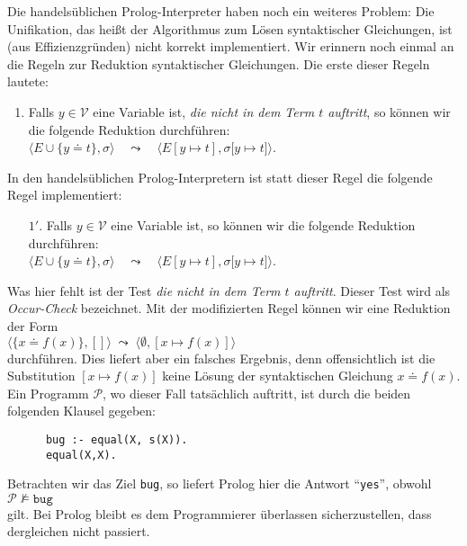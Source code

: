 Die handelsüblichen Prolog-Interpreter haben noch ein weiteres Problem: Die Unifikation,
das heißt der Algorithmus zum Lösen syntaktischer Gleichungen, ist (aus Effizienzgründen)
nicht korrekt implementiert.  Wir erinnern noch einmal an die Regeln zur Reduktion
syntaktischer Gleichungen.  Die erste dieser Regeln lautete:
\begin{enumerate}
\item Falls $y\in\mathcal{V}$ eine Variable ist, {\em die nicht in dem Term $t$ auftritt}, so
      können wir die folgende Reduktion durchführen: \\[0.1cm]
      \hspace*{2.1cm} $\Big\langle E \cup \big\{ y \doteq t \big\}, \sigma \Big\rangle \quad\leadsto\quad \Big\langle E[y \mapsto t], \sigma\big[ y \mapsto t \big] \Big\rangle$.
\end{enumerate}
In den handelsüblichen Prolog-Interpretern ist statt dieser Regel die folgende Regel
implementiert:
\begin{enumerate}
\item[$1'$.] Falls $y\in\mathcal{V}$ eine Variable ist, so
      können wir die folgende Reduktion durchführen: \\[0.1cm]
      \hspace*{2.1cm} $\Big\langle E \cup \big\{ y \doteq t \big\}, \sigma \Big\rangle \quad\leadsto\quad \Big\langle E[y \mapsto t], \sigma\big[ y \mapsto t \big] \Big\rangle$.
\end{enumerate}
Was hier fehlt ist der Test {\em die nicht in dem Term $t$ auftritt}.  Dieser Test
wird als \emph{Occur-Check} bezeichnet.  Mit der modifizierten Regel können wir eine
Reduktion der Form
\\[0.1cm]
\hspace*{1.3cm} $\langle \{ x \doteq f(x) \}, [] \rangle \;\leadsto\; \langle \emptyset, [ x \mapsto f(x) ] \rangle$ \\[0.1cm]
durchführen.  Dies liefert aber ein falsches Ergebnis, denn offensichtlich ist die Substitution 
$[x \mapsto f(x)]$ keine Lösung der syntaktischen Gleichung $x \doteq f(x)$.  
Ein  Programm $\mathcal{P}$, wo dieser Fall tatsächlich auftritt, ist durch die beiden folgenden Klausel gegeben: 
\begin{verbatim}
      bug :- equal(X, s(X)).
      equal(X,X).
\end{verbatim}
Betrachten wir das Ziel \texttt{bug}, so liefert Prolog hier die Antwort ``\texttt{yes}'', obwohl \\[0.1cm]
\hspace*{1.3cm} $\mathcal{P} \not\models \mathtt{bug}$ \\[0.1cm]
gilt.
Bei Prolog bleibt es dem Programmierer überlassen sicherzustellen, dass dergleichen nicht 
passiert.

